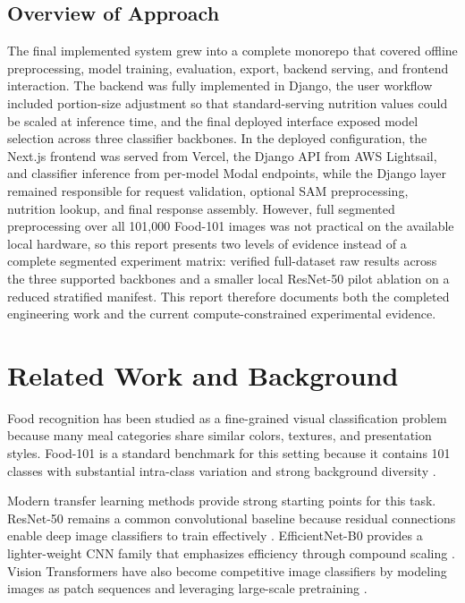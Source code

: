 \documentclass[sigconf,nonacm,11pt]{acmart}
\begin{document}
\subsection{Overview of Approach}
The final implemented system grew into a complete monorepo that covered offline preprocessing, model training, evaluation, export, backend serving, and frontend interaction. The backend was fully implemented in Django, the user workflow included portion-size adjustment so that standard-serving nutrition values could be scaled at inference time, and the final deployed interface exposed model selection across three classifier backbones. In the deployed configuration, the Next.js frontend was served from Vercel, the Django API from AWS Lightsail, and classifier inference from per-model Modal endpoints, while the Django layer remained responsible for request validation, optional SAM preprocessing, nutrition lookup, and final response assembly. However, full segmented preprocessing over all 101,000 Food-101 images was not practical on the available local hardware, so this report presents two levels of evidence instead of a complete segmented experiment matrix: verified full-dataset raw results across the three supported backbones and a smaller local ResNet-50 pilot ablation on a reduced stratified manifest. This report therefore documents both the completed engineering work and the current compute-constrained experimental evidence.

\section{Related Work and Background}
Food recognition has been studied as a fine-grained visual classification problem because many meal categories share similar colors, textures, and presentation styles. Food-101 is a standard benchmark for this setting because it contains 101 classes with substantial intra-class variation and strong background diversity \cite{bossard2014food101}.

Modern transfer learning methods provide strong starting points for this task. ResNet-50 remains a common convolutional baseline because residual connections enable deep image classifiers to train effectively \cite{he2016resnet}. EfficientNet-B0 provides a lighter-weight CNN family that emphasizes efficiency through compound scaling \cite{tan2019efficientnet}. Vision Transformers have also become competitive image classifiers by modeling images as patch sequences and leveraging large-scale pretraining \cite{dosovitskiy2021vit}.
\end{document}
